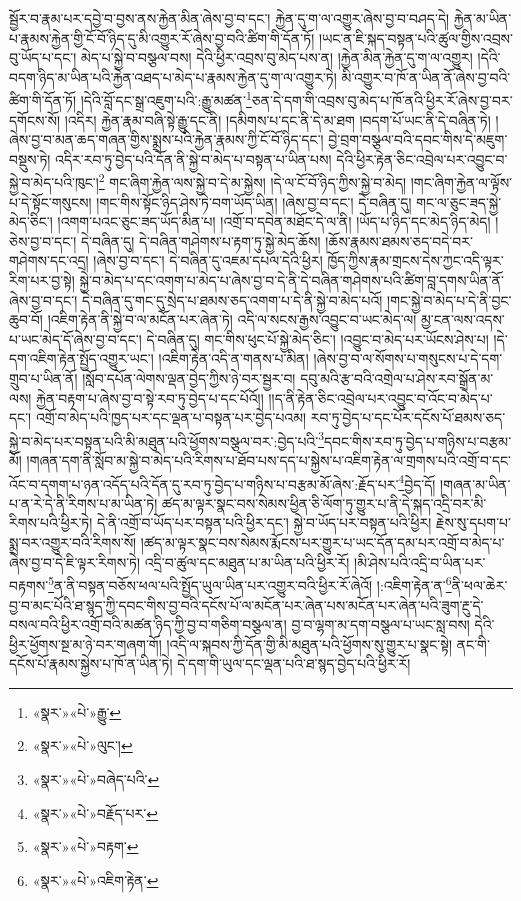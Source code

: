 སྦྱོར་བ་རྣམ་པར་དབྱེ་བ་བྱས་ནས་རྐྱེན་མིན་ཞེས་བྱ་བ་དང་། རྐྱེན་དུ་ག་ལ་འགྱུར་ཞེས་བྱ་བ་བཤད་དེ། རྐྱེན་མ་ཡིན་པ་རྣམས་རྐྱེན་གྱི་ངོ་བོ་ཉིད་དུ་མི་འགྱུར་རོ་ཞེས་བྱ་བའི་ཚིག་གི་དོན་ཏོ། །ཡང་ན་ཇི་སྐད་བསྟན་པའི་ཚུལ་གྱིས་འབྲས་བུ་ཡོད་པ་དང་། མེད་པ་སྐྱེ་བ་བསྩལ་བས། དེའི་ཕྱིར་འབྲས་བུ་མེད་པས་ན། །རྐྱེན་མིན་རྐྱེན་དུ་ག་ལ་འགྱུར། །དེའི་བདག་ཉིད་མ་ཡིན་པའི་རྐྱེན་འཐད་པ་མེད་པ་རྣམས་རྐྱེན་དུ་ག་ལ་འགྱུར་ཏེ། མི་འགྱུར་བ་ཁོ་ན་ཡིན་ནོ་ཞེས་བྱ་བའི་ཚིག་གི་དོན་ཏོ། །དེའི་བློ་དང་སྒྲ་འཇུག་པའི་:རྒྱུ་མཚན་\footnote{«སྣར་»«པེ་»རྒྱུ་}ཅན་དེ་དག་གི་འབྲས་བུ་མེད་པ་ཁོ་ནའི་ཕྱིར་རོ་ཞེས་བྱ་བར་དགོངས་སོ། །འདིར། རྐྱེན་རྣམ་བཞི་སྟེ་རྒྱུ་དང་ནི། །དམིགས་པ་དང་ནི་དེ་མ་ཐག །བདག་པོ་ཡང་ནི་དེ་བཞིན་ཏེ། །ཞེས་བྱ་བ་མན་ཆད་གཞན་གྱིས་སྨྲས་པའི་རྐྱེན་རྣམས་ཀྱི་ངོ་བོ་ཉིད་དང་། བྱེ་བྲག་བསྩལ་བའི་དབང་གིས་དེ་མཇུག་བསྡུས་ཏེ། འདིར་རབ་ཏུ་བྱེད་པའི་དོན་ནི་སྐྱེ་བ་མེད་པ་བསྟན་པ་ཡིན་པས། དེའི་ཕྱིར་རྟེན་ཅིང་འབྲེལ་པར་འབྱུང་བ་སྐྱེ་བ་མེད་པའི་ཁུང་།\footnote{«སྣར་»«པེ་»ལུང་།} གང་ཞིག་རྐྱེན་ལས་སྐྱེ་བ་དེ་མ་སྐྱེས། །དེ་ལ་ངོ་བོ་ཉིད་ཀྱིས་སྐྱེ་བ་མེད། །གང་ཞིག་རྐྱེན་ལ་ལྟོས་པ་དེ་སྟོང་གསུངས། །གང་གིས་སྟོང་ཉིད་ཤེས་ཏེ་བག་ཡོད་ཡིན། །ཞེས་བྱ་བ་དང་། དེ་བཞིན་དུ། གང་ལ་ཅུང་ཟད་སྐྱེ་མེད་ཅིང་། །འགག་པའང་ཅུང་ཟད་ཡོད་མིན་པ། །འགྲོ་བ་དབེན་མཐོང་དེ་ལ་ནི། །ཡོད་པ་ཉིད་དང་མེད་ཉིད་མེད། །ཅེས་བྱ་བ་དང་། དེ་བཞིན་དུ། དེ་བཞིན་གཤེགས་པ་རྟག་ཏུ་སྐྱེ་མེད་ཆོས། །ཆོས་རྣམས་ཐམས་ཅད་བདེ་བར་གཤེགས་དང་འདྲ། །ཞེས་བྱ་བ་དང་། དེ་བཞིན་དུ་འཇམ་དཔལ་དེའི་ཕྱིར། ཁྱོད་ཀྱིས་རྣམ་གྲངས་དེས་ཀྱང་འདི་ལྟར་རིག་པར་བྱ་སྟེ། སྐྱེ་བ་མེད་པ་དང་འགག་པ་མེད་པ་ཞེས་བྱ་བ་དེ་ནི་དེ་བཞིན་གཤེགས་པའི་ཚིག་བླ་དགས་ཡིན་ནོ་ཞེས་བྱ་བ་དང་། དེ་བཞིན་དུ་གང་དུ་སྲེད་པ་ཐམས་ཅད་འགག་པ་དེ་ནི་སྐྱེ་བ་མེད་པའོ། །གང་སྐྱེ་བ་མེད་པ་དེ་ནི་བྱང་ཆུབ་བོ། །འཇིག་རྟེན་ནི་སྐྱེ་བ་ལ་མངོན་པར་ཞེན་ཏེ། འདི་ལ་སངས་རྒྱས་འབྱུང་བ་ཡང་མེད་ལ། མྱ་ངན་ལས་འདས་པ་ཡང་མེད་དོ་ཞེས་བྱ་བ་དང་། དེ་བཞིན་དུ། གང་གིས་ཕུང་པོ་སྐྱེ་མེད་ཅིང་། །འབྱུང་བ་མེད་པར་ཡོངས་ཤེས་པ། །དེ་དག་འཇིག་རྟེན་སྤྱོད་འགྱུར་ཡང་། །འཇིག་རྟེན་འདི་ན་གནས་པ་མིན། །ཞེས་བྱ་བ་ལ་སོགས་པ་གསུངས་པ་དེ་དག་གྲུབ་པ་ཡིན་ནོ། །སློབ་དཔོན་ལེགས་ལྡན་བྱེད་ཀྱིས་ཉེ་བར་སྦྱར་བ། དབུ་མའི་རྩ་བའི་འགྲེལ་པ་ཤེས་རབ་སྒྲོན་མ་ལས། རྐྱེན་བརྟག་པ་ཞེས་བྱ་བ་སྟེ་རབ་ཏུ་བྱེད་པ་དང་པོའོ།། །།ད་ནི་རྟེན་ཅིང་འབྲེལ་པར་འབྱུང་བ་འོང་བ་མེད་པ་དང་། འགྲོ་བ་མེད་པའི་ཁྱད་པར་དང་ལྡན་པ་བསྟན་པར་བྱེད་པའམ། རབ་ཏུ་བྱེད་པ་དང་པོར་དངོས་པོ་ཐམས་ཅད་སྐྱེ་བ་མེད་པར་བསྟན་པའི་མི་མཐུན་པའི་ཕྱོགས་བསྩལ་བར་:བྱེད་པའི་\footnote{«སྣར་»«པེ་»བཞེད་པའི་}དབང་གིས་རབ་ཏུ་བྱེད་པ་གཉིས་པ་བརྩམ་མོ། །གཞན་དག་ནི་སློབ་མ་སྐྱེ་བ་མེད་པའི་རིགས་པ་ཐོབ་པས་དད་པ་སྐྱེས་པ་འཇིག་རྟེན་ལ་གྲགས་པའི་འགྲོ་བ་དང་འོང་བ་དགག་པ་ཉན་འདོད་པའི་དོན་དུ་རབ་ཏུ་བྱེད་པ་གཉིས་པ་བརྩམ་མོ་ཞེས་:རྗོད་པར་\footnote{«སྣར་»«པེ་»བརྗོད་པར་}བྱེད་དོ། །གཞན་མ་ཡིན་པ་ན་རེ་དེ་ནི་རིགས་པ་མ་ཡིན་ཏེ། ཚད་མ་ལྟར་སྣང་བས་སེམས་ཕྱིན་ཅི་ལོག་ཏུ་གྱུར་པ་ནི་དེ་སྐད་འདྲི་བར་མི་རིགས་པའི་ཕྱིར་ཏེ། དེ་ནི་འགྲོ་བ་ཡོད་པར་བསྟན་པའི་ཕྱིར་དང་། སྐྱེ་བ་ཡོད་པར་བསྟན་པའི་ཕྱིར། རྗེས་སུ་དཔག་པ་སྨྲ་བར་འགྱུར་བའི་རིགས་སོ། །ཚད་མ་ལྟར་སྣང་བས་སེམས་རྨོངས་པར་གྱུར་པ་ཡང་དོན་དམ་པར་འགྲོ་བ་མེད་པ་ཞེས་བྱ་བ་དེ་ཇི་ལྟར་རིགས་ཏེ། འདྲི་བ་ཚུལ་དང་མཐུན་པ་མ་ཡིན་པའི་ཕྱིར་རོ། །མི་ཤེས་པའི་འདྲི་བ་ཡིན་པར་བརྟགས་\footnote{«སྣར་»«པེ་»བརྟག་}ན་ནི་བསྟན་བཅོས་ཕལ་པའི་སྤྱོད་ཡུལ་ཡིན་པར་འགྱུར་བའི་ཕྱིར་རོ་ཞེའོ། །:འཇིག་རྟེན་ན་\footnote{«སྣར་»«པེ་»འཇིག་རྟེན་}ནི་ཕལ་ཆེར་བྱ་བ་མང་པོའི་ཐ་སྙད་ཀྱི་དབང་གིས་བྱ་བའི་དངོས་པོ་ལ་མངོན་པར་ཞེན་པས་མངོན་པར་ཞེན་པའི་ཟུག་རྔུ་དེ་བསལ་བའི་ཕྱིར་འགྲོ་བའི་མཚན་ཉིད་ཀྱི་བྱ་བ་གཅིག་བསྩལ་ན། བྱ་བ་ལྷག་མ་དག་བསྩལ་པ་ཡང་སླ་བས། དེའི་ཕྱིར་ཕྱོགས་སྔ་མ་ཉེ་བར་གཞག་གོ། །འདི་ལ་སྐབས་ཀྱི་དོན་གྱི་མི་མཐུན་པའི་ཕྱོགས་སུ་གྱུར་པ་སྣང་སྟེ། ནང་གི་དངོས་པོ་རྣམས་སྐྱེས་པ་ཁོ་ན་ཡིན་ཏེ། དེ་དག་གི་ཡུལ་དང་ལྡན་པའི་ཐ་སྙད་བྱེད་པའི་ཕྱིར་རོ། 